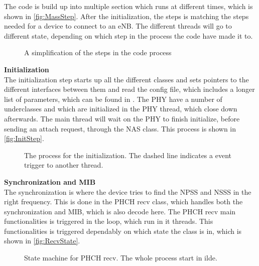 The code is build up into multiple section which runs at different times, which is shown in \autoref{fig:MassStep}. After the initialization, the steps is matching the steps needed for a device to connect to an eNB. The different threads will go to different state, depending on which step in the process the code have made it to.

\begin{figure}[H]
\centering
{}
\resizebox{0.5\textwidth}{!}{
}
\caption{A simplification of the steps in the code process}
\label{fig:MassStep}
\end{figure}

\textbf{Initialization} \\
The initialization step starts up all the different classes and sets pointers to the different interfaces between them and read the config file, which includes a longer list of parameters, which can be found in . The PHY have a number of underclasses and which are initialized in the PHY thread, which close down afterwards. The main thread will wait on the PHY to finish initialize, before sending an attach request, through the NAS class. This process is shown in \autoref{fig:InitStep}.

\begin{figure}[H]
\centering
{}
\resizebox{0.5\textwidth}{!}{
}
\caption{The process for the initialization. The dashed line indicates a event trigger to another thread.}
\label{fig:InitStep}
\end{figure}


\textbf{Synchronization and MIB} \\
The synchronization is where the device tries to find the NPSS and NSSS in the right frequency. This is done in the PHCH recv class, which handles both the synchronization and MIB, which is also decode here. The PHCH recv main functionalities is triggered in the loop, which run in it threads. This functionalities is triggered dependably on which state the class is in, which is shown in \autoref{fig:RecvState}.

\begin{figure}[H]
\centering
{}
\resizebox{0.5\textwidth}{!}{
}
\caption{State machine for PHCH recv. The whole process start in ilde.}
\label{fig:RecvState}
\end{figure}

